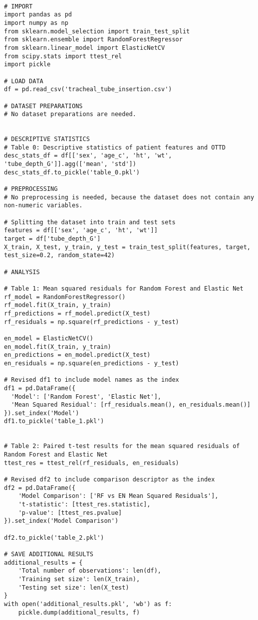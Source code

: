 \documentclass[11pt]{article}
\begin{document}
\begin{verbatim}

# IMPORT 
import pandas as pd
import numpy as np
from sklearn.model_selection import train_test_split
from sklearn.ensemble import RandomForestRegressor
from sklearn.linear_model import ElasticNetCV
from scipy.stats import ttest_rel
import pickle

# LOAD DATA
df = pd.read_csv('tracheal_tube_insertion.csv')

# DATASET PREPARATIONS
# No dataset preparations are needed.


# DESCRIPTIVE STATISTICS
# Table 0: Descriptive statistics of patient features and OTTD
desc_stats_df = df[['sex', 'age_c', 'ht', 'wt', 'tube_depth_G']].agg(['mean', 'std'])
desc_stats_df.to_pickle('table_0.pkl')

# PREPROCESSING
# No preprocessing is needed, because the dataset does not contain any non-numeric variables.

# Splitting the dataset into train and test sets
features = df[['sex', 'age_c', 'ht', 'wt']]
target = df['tube_depth_G']
X_train, X_test, y_train, y_test = train_test_split(features, target, test_size=0.2, random_state=42)

# ANALYSIS

# Table 1: Mean squared residuals for Random Forest and Elastic Net
rf_model = RandomForestRegressor()
rf_model.fit(X_train, y_train)
rf_predictions = rf_model.predict(X_test)
rf_residuals = np.square(rf_predictions - y_test)

en_model = ElasticNetCV()
en_model.fit(X_train, y_train)
en_predictions = en_model.predict(X_test)
en_residuals = np.square(en_predictions - y_test)

# Revised df1 to include model names as the index
df1 = pd.DataFrame({
  'Model': ['Random Forest', 'Elastic Net'],
  'Mean Squared Residual': [rf_residuals.mean(), en_residuals.mean()]
}).set_index('Model')
df1.to_pickle('table_1.pkl')


# Table 2: Paired t-test results for the mean squared residuals of Random Forest and Elastic Net
ttest_res = ttest_rel(rf_residuals, en_residuals) 

# Revised df2 to include comparison descriptor as the index
df2 = pd.DataFrame({
    'Model Comparison': ['RF vs EN Mean Squared Residuals'],
    't-statistic': [ttest_res.statistic],
    'p-value': [ttest_res.pvalue]
}).set_index('Model Comparison')

df2.to_pickle('table_2.pkl')

# SAVE ADDITIONAL RESULTS
additional_results = {
    'Total number of observations': len(df), 
    'Training set size': len(X_train),
    'Testing set size': len(X_test) 
}
with open('additional_results.pkl', 'wb') as f:
    pickle.dump(additional_results, f)

\end{verbatim}
\end{document}

